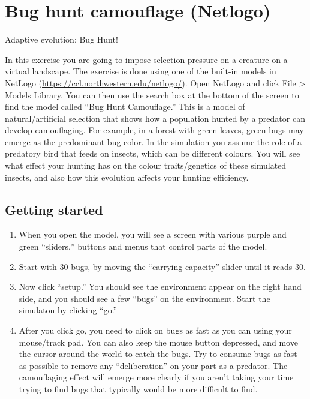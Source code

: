 \documentclass[
  a4paper]{book}
\providecommand{\tightlist}{%
  \setlength{\itemsep}{0pt}\setlength{\parskip}{0pt}}
\begin{document}
\hypertarget{bug-hunt-camouflage-netlogo}{%
\chapter{Bug hunt camouflage
(Netlogo)}\label{bug-hunt-camouflage-netlogo}}

Adaptive evolution: Bug Hunt!

In this exercise you are going to impose selection pressure on a
creature on a virtual landscape. The exercise is done using one of the
built-in models in NetLogo
(\url{https://ccl.northwestern.edu/netlogo/}). Open NetLogo and click
File \textgreater{} Models Library. You can then use the search box at
the bottom of the screen to find the model called ``Bug Hunt
Camouflage.'' This is a model of natural/artificial selection that shows
how a population hunted by a predator can develop camouflaging. For
example, in a forest with green leaves, green bugs may emerge as the
predominant bug color. In the simulation you assume the role of a
predatory bird that feeds on insects, which can be different colours.
You will see what effect your hunting has on the colour traits/genetics
of these simulated insects, and also how this evolution affects your
hunting efficiency.

\hypertarget{getting-started}{%
\section{Getting started}\label{getting-started}}

\begin{enumerate}
\def\labelenumi{\arabic{enumi}.}
\tightlist
\item
  When you open the model, you will see a screen with various purple and
  green ``sliders,'' buttons and menus that control parts of the model.
\item
  Start with 30 bugs, by moving the ``carrying-capacity'' slider until
  it reads 30.
\item
  Now click ``setup.'' You should see the environment appear on the
  right hand side, and you should see a few ``bugs'' on the environment.
  Start the simulaton by clicking ``go.''
\item
  After you click go, you need to click on bugs as fast as you can using
  your mouse/track pad. You can also keep the mouse button depressed,
  and move the cursor around the world to catch the bugs. Try to consume
  bugs as fast as possible to remove any ``deliberation'' on your part
  as a predator. The camouflaging effect will emerge more clearly if you
  aren't taking your time trying to find bugs that typically would be
  more difficult to find.
\end{enumerate}
\end{document}
